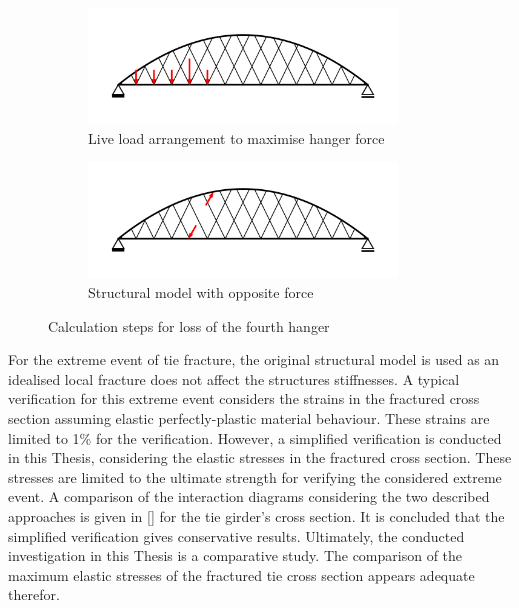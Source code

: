 \begin{figure}[H]
\centering
\begin{subfigure}{0.5\textwidth}
    \centering
    \includegraphics[trim={0 0.8cm 0 0.8cm},clip, width=0.9\textwidth]{illustrations/figures/cable loss - load arrangement.png}
    \caption{Live load arrangement to maximise hanger force}
    \label{fig:Cable_Loss_1}
\end{subfigure}%
\begin{subfigure}{.5\textwidth}
    \centering
    \includegraphics[trim={0 0.8cm 0 0.8cm},clip, width=0.9\textwidth]{illustrations/figures/cable loss.png}
    \caption{Structural model with opposite force}
    \label{fig:Cable_Loss_2}
\end{subfigure}
\caption{Calculation steps for loss of the fourth hanger}
\label{fig:Cable_Loss}
\end{figure}

For the extreme event of tie fracture, the original structural model is used as an idealised local fracture does not affect the structures stiffnesses. A typical verification for this extreme event considers the strains in the fractured cross section assuming elastic perfectly-plastic material behaviour. These strains are limited to 1\% for the verification. However, a simplified verification is conducted in this Thesis, considering the elastic stresses in the fractured cross section. These stresses are limited to the ultimate strength for verifying the considered extreme event. A comparison of the interaction diagrams considering the two described approaches is given in [] for the tie girder's cross section. It is concluded that the simplified verification gives conservative results. Ultimately, the conducted investigation in this Thesis is a comparative study. The comparison of the maximum elastic stresses of the fractured tie cross section appears adequate therefor.

